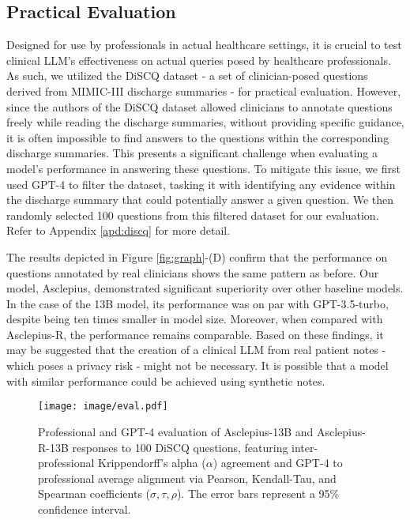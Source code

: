\documentclass[11pt]{article}
\begin{document}
\subsection{Practical Evaluation}\label{DiSCQ}
Designed for use by professionals in actual healthcare settings, it is crucial to test clinical LLM's effectiveness on actual queries posed by healthcare professionals. 
As such, we utilized the DiSCQ dataset \citep{lehman2022learning} - a set of clinician-posed questions derived from MIMIC-III discharge summaries - for practical evaluation.
However, since the authors of the DiSCQ dataset allowed clinicians to annotate questions freely while reading the discharge summaries, without providing specific guidance, it is often impossible to find answers to the questions within the corresponding discharge summaries. 
This presents a significant challenge when evaluating a model's performance in answering these questions.
To mitigate this issue, we first used GPT-4 to filter the dataset, tasking it with identifying any evidence within the discharge summary that could potentially answer a given question. 
We then randomly selected 100 questions from this filtered dataset for our evaluation.
Refer to Appendix \ref{apd:discq} for more detail.




The results depicted in Figure \ref{fig:graph}-(D) confirm that the performance on questions annotated by real clinicians shows the same pattern as before. 
Our model, Asclepius, demonstrated significant superiority over other baseline models. 
In the case of the 13B model, its performance was on par with GPT-3.5-turbo, despite being ten times smaller in model size.
Moreover, when compared with Asclepius-R, the performance remains comparable.
Based on these findings, it may be suggested that the creation of a clinical LLM from real patient notes - which poses a privacy risk - might not be necessary.
It is possible that a model with similar performance could be achieved using synthetic notes.

\begin{figure}[t]
\texttt{[image: image/eval.pdf]}
\caption{Professional and GPT-4 evaluation of Asclepius-13B and Asclepius-R-13B responses to 100 DiSCQ questions, featuring inter-professional Krippendorff's alpha ($\alpha$) agreement and GPT-4 to professional average alignment via Pearson, Kendall-Tau, and Spearman coefficients ($\sigma,\tau, \rho$).
The error bars represent a 95\% confidence interval.
}
\label{fig:eval}
\end{figure}
\end{document}

